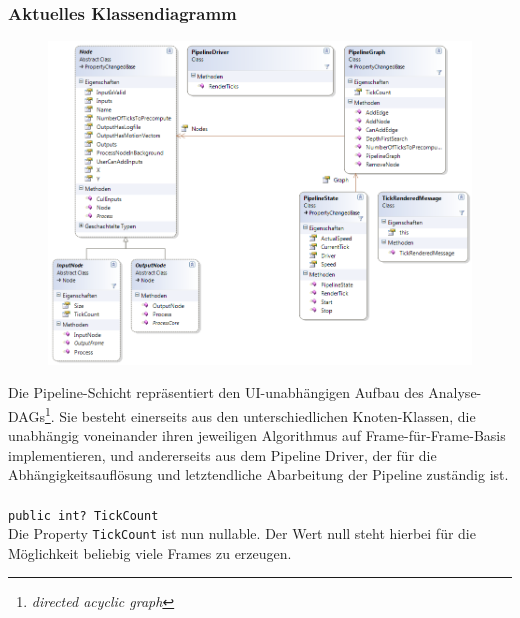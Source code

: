 \subsubsection*{Aktuelles Klassendiagramm}
\begin{figure}[h!]
\begin{center}
\includegraphics[width=\textwidth]{classdiagram/pipe.png}
\end{center}
\end{figure}
Die Pipeline-Schicht repräsentiert den UI-unabhängigen Aufbau des Analyse-DAGs\footnote{\emph{directed acyclic graph}}. Sie besteht einerseits aus den unterschiedlichen Knoten-Klassen, die unabhängig voneinander ihren jeweiligen Algorithmus auf Frame-für-Frame-Basis implementieren, und andererseits aus dem Pipeline Driver, der für die Abhängigkeitsauflösung und letztendliche Abarbeitung der Pipeline zuständig ist.
\newpage

\paragraph{}
\begin{itemize}
	\change \verb!public int? TickCount! \\
	Die Property \verb!TickCount! ist nun nullable. Der Wert null steht hierbei für die Möglichkeit beliebig viele Frames zu erzeugen.
\end{itemize}

